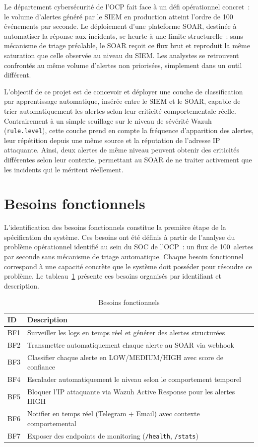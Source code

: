 \documentclass[12pt,a4paper]{report}
\begin{document}
Le département cybersécurité de l'OCP fait face à un défi opérationnel concret~: le volume d'alertes généré par le SIEM en production atteint l'ordre de 100 événements par seconde. Le déploiement d'une plateforme SOAR, destinée à automatiser la réponse aux incidents, se heurte à une limite structurelle~: sans mécanisme de triage préalable, le SOAR reçoit ce flux brut et reproduit la même saturation que celle observée au niveau du SIEM. Les analystes se retrouvent confrontés au même volume d'alertes non priorisées, simplement dans un outil différent.

L'objectif de ce projet est de concevoir et déployer une couche de classification par apprentissage automatique, insérée entre le SIEM et le SOAR, capable de trier automatiquement les alertes selon leur criticité comportementale réelle. Contrairement à un simple seuillage sur le niveau de sévérité Wazuh (\texttt{rule.level}), cette couche prend en compte la fréquence d'apparition des alertes, leur répétition depuis une même source et la réputation de l'adresse IP attaquante. Ainsi, deux alertes de même niveau peuvent obtenir des criticités différentes selon leur contexte, permettant au SOAR de ne traiter activement que les incidents qui le méritent réellement.

\section{Besoins fonctionnels}

L'identification des besoins fonctionnels constitue la première étape de la spécification du système. Ces besoins ont été définis à partir de l'analyse du problème opérationnel identifié au sein du SOC de l'OCP~: un flux de 100~alertes par seconde sans mécanisme de triage automatique. Chaque besoin fonctionnel correspond à une capacité concrète que le système doit posséder pour résoudre ce problème. Le tableau~\ref{tab:bf} présente ces besoins organisés par identifiant et description.

\begin{table}[H]
\centering
\caption{Besoins fonctionnels}
\label{tab:bf}
\begin{tabular}{|l|p{10cm}|}
\hline
\rowcolor{ColSection!15}
\textbf{ID} & \textbf{Description} \\
\hline
BF1 & Surveiller les logs en temps réel et générer des alertes structurées \\
BF2 & Transmettre automatiquement chaque alerte au SOAR via webhook \\
BF3 & Classifier chaque alerte en LOW/MEDIUM/HIGH avec score de confiance \\
BF4 & Escalader automatiquement le niveau selon le comportement temporel \\
BF5 & Bloquer l'IP attaquante via Wazuh Active Response pour les alertes HIGH \\
BF6 & Notifier en temps réel (Telegram + Email) avec contexte comportemental \\
BF7 & Exposer des endpoints de monitoring (\texttt{/health}, \texttt{/stats}) \\
\hline
\end{tabular}
\end{table}
\end{document}
